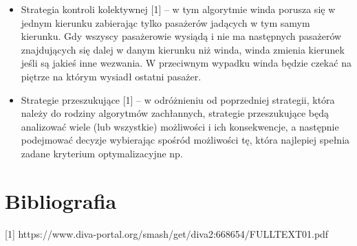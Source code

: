 \documentclass[a4paper,11pt]{article}
\begin{document}
\begin{itemize}
\item Strategia kontroli kolektywnej [1] -- w tym algorytmie winda porusza się w jednym kierunku zabierając tylko pasażerów jadących w tym samym kierunku. Gdy wszyscy pasażerowie wysiądą i nie ma następnych pasażerów znajdujących się dalej w danym kierunku niż winda, winda zmienia kierunek jeśli są jakieś inne wezwania. W przeciwnym wypadku winda będzie czekać na piętrze na którym wysiadł ostatni pasażer.
\item Strategie przeszukujące [1] -- w odróżnieniu od poprzedniej strategii, która należy do rodziny algorytmów zachłannych, strategie przeszukujące będą analizować wiele (lub wszystkie) możliwości i ich konsekwencje, a następnie podejmować decyzje wybierając spośród możliwości tę, która najlepiej spełnia zadane kryterium optymalizacyjne np. 
\end{itemize}

\section{Bibliografia}
[1] https://www.diva-portal.org/smash/get/diva2:668654/FULLTEXT01.pdf
\end{document}
